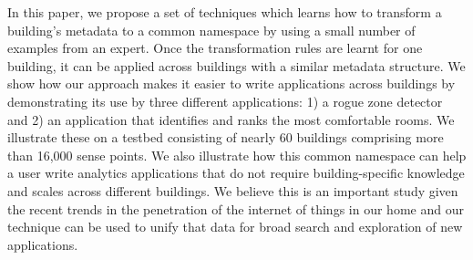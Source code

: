 

In this paper, we propose a set of techniques which learns how to transform a 
building's metadata 
to a common namespace by using a small number of examples from an expert. Once the transformation 
rules are learnt for one building, it can be applied across buildings with a similar 
metadata structure.  
We show how our approach makes it easier to write applications across buildings by
demonstrating its use by three different applications: 1) a rogue zone detector and 
2) an application that identifies and ranks the most comfortable
rooms. We illustrate these on a testbed consisting of nearly 60 buildings comprising more 
than 16,000 sense points. We also illustrate how this common namespace can help a user write 
analytics applications that do not require building-specific knowledge and scales across 
different buildings.
We believe this is an important study given the recent trends in the penetration
of the internet of things in our home and our technique can be used to unify that data
for broad search and exploration of new applications.


 
